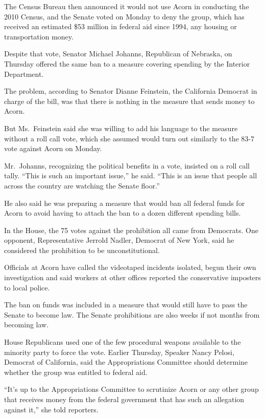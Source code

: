 ﻿\documentclass[12pt]{article}
\begin{document}
The Census Bureau then announced it would not use Acorn in conducting the 2010 Census, and the
Senate voted on Monday to deny the group, which has received an estimated \$53 million in federal
aid since 1994, any housing or transportation money.

Despite that vote, Senator Michael Johanns, Republican of Nebraska, on Thursday offered the same ban
to a measure covering spending by the Interior Department.

The problem, according to Senator Dianne Feinstein, the California Democrat in charge of the bill,
was that there is nothing in the measure that sends money to Acorn.

But Ms.~Feinstein said she was willing to add his language to the measure without a roll call vote,
which she assumed would turn out similarly to the 83-7 vote against Acorn on Monday.

Mr.~Johanns, recognizing the political benefits in a vote, insisted on a roll call tally. ``This is
such an important issue,'' he said. ``This is an issue that people all across the country are
watching the Senate floor.''

He also said he was preparing a measure that would ban all federal funds for Acorn to avoid having
to attach the ban to a dozen different spending bills.

In the House, the 75 votes against the prohibition all came from Democrats. One opponent,
Representative Jerrold Nadler, Democrat of New York, said he considered the prohibition to be
unconstitutional.

Officials at Acorn have called the videotaped incidents isolated, begun their own investigation and
said workers at other offices reported the conservative imposters to local police.

The ban on funds was included in a measure that would still have to pass the Senate to become law.
The Senate prohibitions are also weeks if not months from becoming law.

House Republicans used one of the few procedural weapons available to the minority party to force
the vote. Earlier Thursday, Speaker Nancy Pelosi, Democrat of California, said the Appropriations
Committee should determine whether the group was entitled to federal aid.

``It's up to the Appropriations Committee to scrutinize Acorn or any other group that receives money
from the federal government that has such an allegation against it,'' she told reporters.
\end{document}
